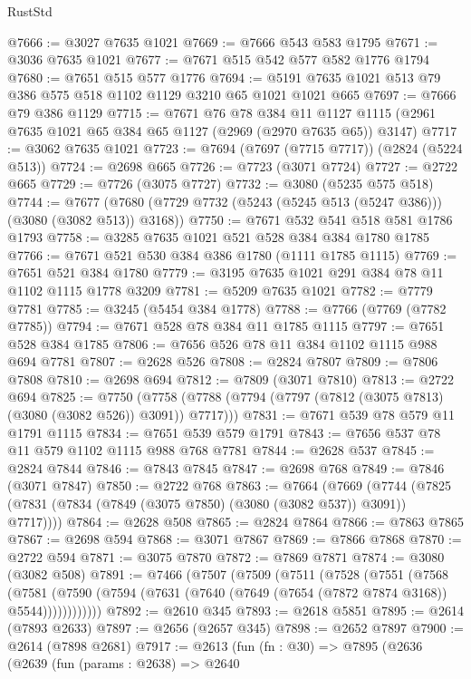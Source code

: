\begin{lexlean}{RustStd}
\begin{coremodule}
@7666 := @3027 @7635 @1021
@7669 := @7666 @543 @583 @1795
@7671 := @3036 @7635 @1021
@7677 := @7671 @515 @542 @577 @582 @1776 @1794
@7680 := @7651 @515 @577 @1776
@7694 := @5191 @7635 @1021 @513 @79 @386 @575 @518 @1102 @1129 @3210 @65 @1021 @1021 @665
@7697 := @7666 @79 @386 @1129
@7715 := @7671
    @76
    @78
    @384
    @11
    @1127
    @1115
    (@2961 @7635 @1021 @65 @384 @65 @1127 (@2969 (@2970 @7635 @65)) @3147)
@7717 := @3062 @7635 @1021
@7723 := @7694 (@7697 (@7715 @7717)) (@2824 (@5224 @513))
@7724 := @2698 @665
@7726 := @7723 (@3071 @7724)
@7727 := @2722 @665
@7729 := @7726 (@3075 @7727)
@7732 := @3080 (@5235 @575 @518)
@7744 := @7677 (@7680 (@7729 @7732 (@5243 (@5245 @513 (@5247 @386))) (@3080 (@3082 @513)) @3168))
@7750 := @7671 @532 @541 @518 @581 @1786 @1793
@7758 := @3285 @7635 @1021 @521 @528 @384 @384 @1780 @1785
@7766 := @7671 @521 @530 @384 @386 @1780 (@1111 @1785 @1115)
@7769 := @7651 @521 @384 @1780
@7779 := @3195 @7635 @1021 @291 @384 @78 @11 @1102 @1115 @1778 @3209
@7781 := @5209 @7635 @1021
@7782 := @7779 @7781
@7785 := @3245 (@5454 @384 @1778)
@7788 := @7766 (@7769 (@7782 @7785))
@7794 := @7671 @528 @78 @384 @11 @1785 @1115
@7797 := @7651 @528 @384 @1785
@7806 := @7656 @526 @78 @11 @384 @1102 @1115 @988 @694 @7781
@7807 := @2628 @526
@7808 := @2824 @7807
@7809 := @7806 @7808
@7810 := @2698 @694
@7812 := @7809 (@3071 @7810)
@7813 := @2722 @694
@7825 := @7750
    (@7758 (@7788 (@7794 (@7797 (@7812 (@3075 @7813) (@3080 (@3082 @526)) @3091)) @7717)))
@7831 := @7671 @539 @78 @579 @11 @1791 @1115
@7834 := @7651 @539 @579 @1791
@7843 := @7656 @537 @78 @11 @579 @1102 @1115 @988 @768 @7781
@7844 := @2628 @537
@7845 := @2824 @7844
@7846 := @7843 @7845
@7847 := @2698 @768
@7849 := @7846 (@3071 @7847)
@7850 := @2722 @768
@7863 := @7664
    (@7669 (@7744 (@7825 (@7831 (@7834 (@7849 (@3075 @7850) (@3080 (@3082 @537)) @3091)) @7717))))
@7864 := @2628 @508
@7865 := @2824 @7864
@7866 := @7863 @7865
@7867 := @2698 @594
@7868 := @3071 @7867
@7869 := @7866 @7868
@7870 := @2722 @594
@7871 := @3075 @7870
@7872 := @7869 @7871
@7874 := @3080 (@3082 @508)
@7891 := @7466
    (@7507
      (@7509
        (@7511
          (@7528
            (@7551
              (@7568
                (@7581
                  (@7590 (@7594 (@7631 (@7640 (@7649 (@7654 (@7872 @7874 @3168)) @5544))))))))))))
@7892 := @2610 @345
@7893 := @2618 @5851
@7895 := @2614 (@7893 @2633)
@7897 := @2656 (@2657 @345)
@7898 := @2652 @7897
@7900 := @2614 (@7898 @2681)
@7917 := @2613
    (fun (fn : @30) =>
    @7895
      (@2636
        (@2639
          (fun (params : @2638) =>
          @2640

\end{coremodule}
\end{lexlean}
